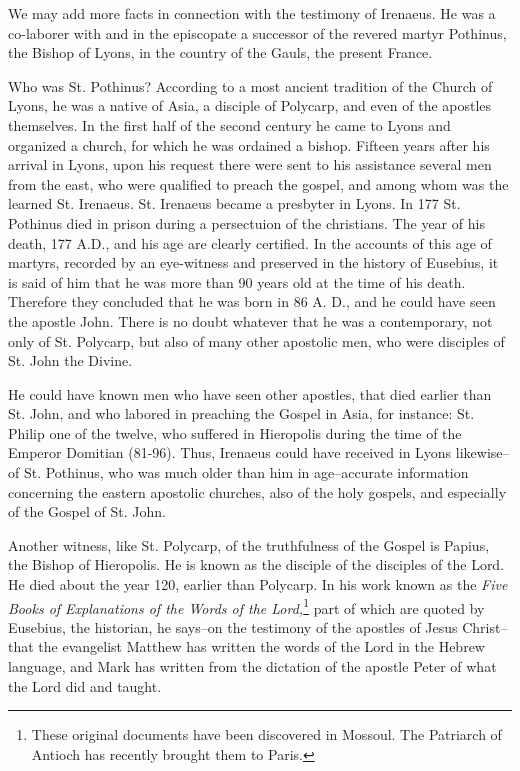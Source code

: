 We may add more facts in connection with the testimony of Irenaeus. He was a co-laborer with and in the episcopate a successor of the revered martyr Pothinus, the Bishop of Lyons, in the country of the Gauls, the present France.

Who was St. Pothinus? According to a most ancient tradition of the Church of Lyons, he was a native of Asia, a disciple of Polycarp, and even of the apostles themselves. In the first half of the second century he came to Lyons and organized a church, for which he was ordained a bishop. Fifteen years after his arrival in Lyons, upon his request there were sent to his assistance several men from the east, who were qualified to preach the gospel, and among whom was the learned St. Irenaeus. St. Irenaeus became a presbyter in Lyons. In 177 St. Pothinus died in prison during a persectuion of the christians. The year of his death, 177 A.D., and his age are clearly certified. In the accounts of this age of martyrs, recorded by an eye-witness and preserved in the history of Eusebius, it is said of him that he was more than 90 years old at the time of his death. Therefore they concluded that he was born in 86 A. D., and he could have seen the apostle John. There is no doubt whatever that he was a contemporary, not only of St. Polycarp, but also of many other apostolic men, who were disciples of St. John the Divine.

He could have known men who have seen other apostles, that died earlier than St. John, and who labored in preaching the Gospel in Asia, for instance: St. Philip one of the twelve, who suffered in Hieropolis during the time of the Emperor Domitian (81-96). Thus, Irenaeus could have received in Lyons likewise--of St. Pothinus, who was much older than him in age--accurate information concerning the eastern apostolic churches, also of the holy gospels, and especially of the Gospel of St. John.

Another witness, like St. Polycarp, of the truthfulness of the Gospel is Papius, the Bishop of Hieropolis. He is known as the disciple of the disciples of the Lord. He died about the year 120, earlier than Polycarp. In his work known as the \textit{Five Books of Explanations of the Words of the Lord,}\footnote{These original documents have been discovered in Mossoul. The Patriarch of Antioch has recently brought them to Paris.} part of which are quoted by Eusebius, the historian, he says--on the testimony of the apostles of Jesus Christ--that the evangelist Matthew has written the words of the Lord in the Hebrew language, and Mark has written from the dictation of the apostle Peter of what the Lord did and taught.

